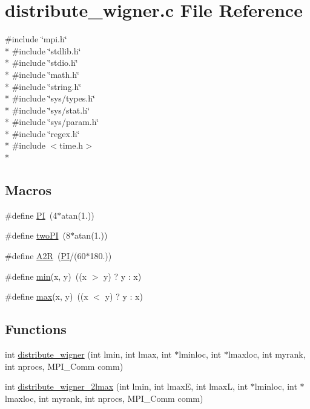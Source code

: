 \section{distribute\-\_\-wigner.\-c File Reference}
\label{kernels_2distribute__wigner_8c}
{\ttfamily \#include \char`\"{}mpi.\-h\char`\"{}}\\*
{\ttfamily \#include \char`\"{}stdlib.\-h\char`\"{}}\\*
{\ttfamily \#include \char`\"{}stdio.\-h\char`\"{}}\\*
{\ttfamily \#include \char`\"{}math.\-h\char`\"{}}\\*
{\ttfamily \#include \char`\"{}string.\-h\char`\"{}}\\*
{\ttfamily \#include \char`\"{}sys/types.\-h\char`\"{}}\\*
{\ttfamily \#include \char`\"{}sys/stat.\-h\char`\"{}}\\*
{\ttfamily \#include \char`\"{}sys/param.\-h\char`\"{}}\\*
{\ttfamily \#include \char`\"{}regex.\-h\char`\"{}}\\*
{\ttfamily \#include $<$time.\-h$>$}\\*
\subsection*{Macros}
\begin{DoxyCompactItemize}
\item 
\#define \hyperlink{kernels_2distribute__wigner_8c_a598a3330b3c21701223ee0ca14316eca}{P\-I}~(4$\ast$atan(1.))
\item 
\#define \hyperlink{kernels_2distribute__wigner_8c_a0a3527f8b23535fe43972fbe88c3cc0d}{two\-P\-I}~(8$\ast$atan(1.))
\item 
\#define \hyperlink{kernels_2distribute__wigner_8c_a7eb5b348f6b35aa19816af220244cebc}{A2\-R}~(\hyperlink{kernels_2distribute__wigner_8c_a598a3330b3c21701223ee0ca14316eca}{P\-I}/(60$\ast$180.))
\item 
\#define \hyperlink{kernels_2distribute__wigner_8c_abb702d8b501669a23aa0ab3b281b9384}{min}(x, y)~((x $>$ y) ? y \-: x)
\item 
\#define \hyperlink{kernels_2distribute__wigner_8c_ac39d9cef6a5e030ba8d9e11121054268}{max}(x, y)~((x $<$ y) ? y \-: x)
\end{DoxyCompactItemize}
\subsection*{Functions}
\begin{DoxyCompactItemize}
\item 
int \hyperlink{kernels_2distribute__wigner_8c_acbe2e94a087052ad894871b4492c16b4}{distribute\-\_\-wigner} (int lmin, int lmax, int $\ast$lminloc, int $\ast$lmaxloc, int myrank, int nprocs, M\-P\-I\-\_\-\-Comm comm)
\item 
int \hyperlink{kernels_2distribute__wigner_8c_aca9cb46f7602d83f737e23cd3e157ccb}{distribute\-\_\-wigner\-\_\-2lmax} (int lmin, int lmax\-E, int lmax\-L, int $\ast$lminloc, int $\ast$lmaxloc, int myrank, int nprocs, M\-P\-I\-\_\-\-Comm comm)
\end{DoxyCompactItemize}


